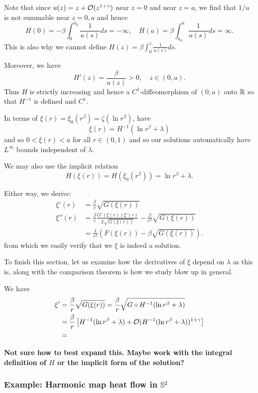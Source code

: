 \documentclass{amsart}
\begin{document}
Note that since \(u(z) = z + \bigo(z^{1 + \gamma})\) near \(z=0\) and near \(z=a\), we find that \(1/u\) is not summable near \(z = 0, a\) and hence
\[
H(0) = -\beta \int_0^{a_0} \frac{1}{u(s)} ds = - \infty, \quad H(a) = \beta \int_{a_0}^a \frac{1}{u(s)} ds = \infty.
\]
This is also why we cannot define \(H(z) = \beta \int_{0}^z \frac{1}{u(s)} ds\).

Moreover, we have
\[
H'(z) = \frac{\beta}{u(z)} > 0, \quad z \in (0, a).
\]
Thus \(H\) is strictly increasing and hence a \(C^1\)-diffeomorphism of \((0, a)\) onto \(\R\) so that \(H^{-1}\) is defined and \(C^1\).

In terms of \(\xi(r) = \xi_0(r^{\beta}) = \zeta(\ln r^{\beta})\), have
\[
\xi(r) = H^{-1} (\ln r^{\beta} + \lambda)
\]
and so \(0 < \xi(r) < a\) for all \(r \in (0, 1)\) and so our solutions automatically have \(L^{\infty}\) bounds independent of \(\lambda\).

We may also use the implicit relation
\[
H (\xi(r)) = H (\xi_0(r^{\beta})) = \ln r^{\beta} + \lambda.
\]

Either way, we derive:
\begin{align*}
\xi'(r) &= \frac{\beta}{r}  \sqrt{G(\xi(r))} \\
\xi''(r) &= \frac{\beta}{r} \frac{G'(\xi(r)) \xi'(r)}{2 \sqrt{G(\xi(r))}} - \frac{\beta}{r^2} \sqrt{G(\xi(r))} \\
&= \frac{1}{r^2} \left(F(\xi(r))- \beta \sqrt{G(\xi(r))}\right).
\end{align*}
from which we easily verify that we \(\xi\) is indeed a solution.

To finish this section, let us examine how the derivatives of \(\xi\) depend on \(\lambda\) as this is, along with the comparison theorem is how we study blow up in general.

We have
\[
\begin{split}
\xi' &= \frac{\beta}{r}  \sqrt{G(\xi(r))} = \frac{\beta}{r}  \sqrt{G \circ H^{-1}(\ln r^{\beta} + \lambda)} \\
&= \frac{\beta}{r} \left[H^{-1} (\ln r^{\beta} + \lambda)  + \bigo(H^{-1} (\ln r^{\beta} + \lambda))^{1 + \gamma}\right] \\
&= 
\end{split}
\]

\textbf{Not sure how to best expand this. Maybe work with the integral definition of \(H\) or the implicit form of the solution?}

\subsubsection*{Example: Harmonic map heat flow in \(\S^2\)}
\end{document}

